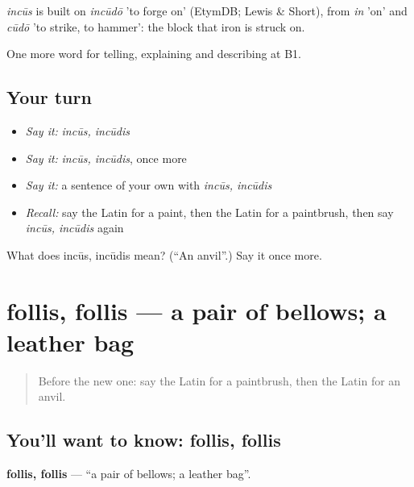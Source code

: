 \begin{cousinweb}
\emph{incūs} is built on \emph{incūdō} 'to forge on' (EtymDB; Lewis \& Short), from \emph{in} 'on' and \emph{cūdō} 'to strike, to hammer': the block that iron is struck on.
\end{cousinweb}

\begin{grammarlens}[title={What you've built}]
One more word for telling, explaining and describing at B1.
\end{grammarlens}

\subsection*{Your turn}
\begin{itemize}
\raggedright
  \item \emph{Say it:} \emph{incūs, incūdis}
  \item \emph{Say it:} \emph{incūs, incūdis}, once more
  \item \emph{Say it:} a sentence of your own with \emph{incūs, incūdis}
  \item \emph{Recall:} say the Latin for a paint, then the Latin for a paintbrush, then say \emph{incūs, incūdis} again
\end{itemize}

\begin{tcolorbox}[breakable,colback=teal!4,colframe=teal!35!black,title={Before you move on}]
What does incūs, incūdis mean? (\textquotedblleft{}An anvil\textquotedblright{}.) Say it once more.
\end{tcolorbox}
\section[follis, follis]{follis, follis — a pair of bellows; a leather bag}

\label{lesson:LA-C469-follis}



\begin{quote}
Before the new one: say the Latin for a paintbrush, then the Latin for an anvil.
\end{quote}

\subsection*{You'll want to know: follis, follis}
\textbf{follis, follis} — \textquotedblleft{}a pair of bellows; a leather bag\textquotedblright{}.

